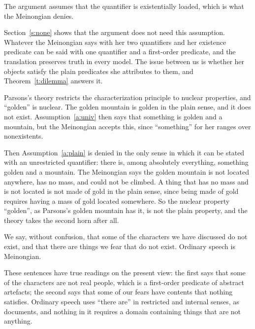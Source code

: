\documentclass{situationist-preprint}
\begin{document}
\begin{objection}
The argument assumes that the quantifier is existentially loaded, which is what the Meinongian denies.
\end{objection}

\begin{reply}
Section~\ref{s:none} shows that the argument does not need this assumption. Whatever the Meinongian says with her two quantifiers and her existence predicate can be said with one quantifier and a first-order predicate, and the translation preserves truth in every model. The issue between us is whether her objects satisfy the plain predicates she attributes to them, and Theorem~\ref{t:dilemma} answers it.
\end{reply}

\begin{objection}
Parsons's theory restricts the characterization principle to nuclear properties, and \enquote{golden} is nuclear. The golden mountain is golden in the plain sense, and it does not exist. Assumption~\ref{a:univ} then says that something is golden and a mountain, but the Meinongian accepts this, since \enquote{something} for her ranges over nonexistents.
\end{objection}

\begin{reply}
Then Assumption~\ref{a:plain} is denied in the only sense in which it can be stated with an unrestricted quantifier: there is, among absolutely everything, something golden and a mountain. The Meinongian says the golden mountain is not located anywhere, has no mass, and could not be climbed. A thing that has no mass and is not located is not made of gold in the plain sense, since being made of gold requires having a mass of gold located somewhere. So the nuclear property \enquote{golden}, as Parsons's golden mountain has it, is not the plain property, and the theory takes the second horn after all.
\end{reply}

\begin{objection}
We say, without confusion, that some of the characters we have discussed do not exist, and that there are things we fear that do not exist. Ordinary speech is Meinongian.
\end{objection}

\begin{reply}
These sentences have true readings on the present view: the first says that some of the characters are not real people, which is a first-order predicate of abstract artefacts; the second says that some of our fears have contents that nothing satisfies. Ordinary speech uses \enquote{there are} in restricted and internal senses, as \citet{Hofweber2016} documents, and nothing in it requires a domain containing things that are not anything.
\end{reply}
\end{document}
